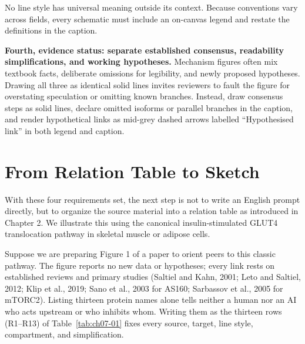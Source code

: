 No line style has universal meaning outside its context. Because conventions vary across fields, every schematic must include an on-canvas legend and restate the definitions in the caption.

\textbf{Fourth, evidence status: separate established consensus, readability simplifications, and working hypotheses.} Mechanism figures often mix textbook facts, deliberate omissions for legibility, and newly proposed hypotheses. Drawing all three as identical solid lines invites reviewers to fault the figure for overstating speculation or omitting known branches. Instead, draw consensus steps as solid lines, declare omitted isoforms or parallel branches in the caption, and render hypothetical links as mid-grey dashed arrows labelled ``Hypothesised link'' in both legend and caption.

\section{From Relation Table to Sketch}

With these four requirements set, the next step is not to write an English prompt directly, but to organize the source material into a relation table as introduced in Chapter 2. We illustrate this using the canonical insulin-stimulated GLUT4 translocation pathway in skeletal muscle or adipose cells.

Suppose we are preparing Figure 1 of a paper to orient peers to this classic pathway. The figure reports no new data or hypotheses; every link rests on established reviews and primary studies (Saltiel and Kahn, 2001; Leto and Saltiel, 2012; Klip et al., 2019; Sano et al., 2003 for AS160; Sarbassov et al., 2005 for mTORC2). Listing thirteen protein names alone tells neither a human nor an AI who acts upstream or who inhibits whom. Writing them as the thirteen rows (R1--R13) of Table~\ref{tab:ch07-01} fixes every source, target, line style, compartment, and simplification.

